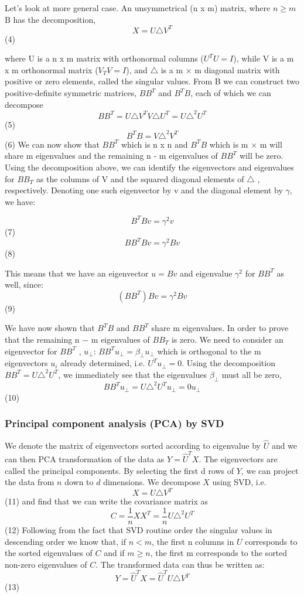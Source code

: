 \documentclass[12pt,twoside]{article}
\begin{document}
\bigbreak
Let's look at more general case. An unsymmetrical (n x m) matrix, where $n \geq m$ B has the decomposition,
$$X = U\triangle V^{T}$$  \hfill(4)

where U is a n x m matrix with orthonormal columns ($U^{T}U = I$), while V is a m x m orthonormal matrix ($V_{T}V = I$), and $\triangle$ is a m × m diagonal matrix with positive or zero elements, called the singular values.
\bigbreak
From B we can construct two positive-definite symmetric matrices, $BB^{T}$ and $B^{T}B$, each of which we can decompose
$$BB^{T} = U\triangle V^{T}V\triangle U^{T} = U\triangle^2U^{T} $$  \hfill(5)
$$B^{T}B = V\triangle^2V^{T} $$ \hfill (6)
\bigbreak
We can now show that $BB^{T}$ which is n x n and $B^{T}B$ which is m × m will share m eigenvalues and the remaining n - m eigenvalues of $BB^{T} $ will be zero.
\bigbreak
Using the decomposition above, we can identify the eigenvectors and eigenvalues for $BB_{T}$ as the columns of V and the squared diagonal elements of $\triangle$ , respectively. Denoting one such eigenvector by v and the diagonal element by $\gamma$, we have:

$$B^{T}Bv = \gamma^2v$$ \hfill (7)
$$BB^{T}Bv = \gamma^2Bv$$  \hfill (8)

\bigbreak
This means that we have an eigenvector $u = Bv$ and eigenvalue $\gamma^2$ for $BB^{T}$ as well, since:
\bigbreak
$$(BB^{T})Bv = \gamma^2Bv$$ \hfill (9)

\bigbreak
We have now shown that $B^{T}B$ and $BB^{T}$ share m eigenvalues.
\bigbreak
In order to prove that the remaining n − m eigenvalues of $BB_{T}$ is zero. We need to consider an eigenvector for  $BB^{T}$ , $u_{\perp}$: $BB^{T} u_{\perp} = \beta_{\perp} u_{\perp}$ which is orthogonal to the m eigenvectors $u_{i}$ already determined, i.e. $U^{T} u_{\perp} = 0$. Using the decomposition $BB^{T} = U\triangle^2U^{T}$, we immediately see that the eigenvalues $\beta_{\perp}$ must all be zero,
$$BB^{T} u_{\perp} = U\triangle^2U^{T} u_{\perp} = 0 u_{\perp}$$ \hfill (10)
\bigbreak
\subsubsection*{Principal component analysis (PCA) by SVD}
\bigbreak
We denote the matrix of eigenvectors sorted according to eigenvalue by $\hat{U}$ and we can then PCA transformation of the data as $Y = \hat{U}^{T}X$. The eigenvectors are called the principal components. By selecting the first d rows of $Y$, we can project the data from $n$ down to $d$ dimensions.
\bigbreak
We decompose $X$ using SVD, i.e.
$$X = U\triangle V^{T}$$ \hfill (11)\newline
and find that we can write the covariance matrix as
$$C = \frac{1}{n} XX^{T} = \frac{1}{n} U\triangle^2U^{T}$$ \hfill (12)
\bigbreak
Following from the fact that SVD routine order the singular values in descending order we know that, if $n < m$, the first n columns in $U$ corresponds to the sorted eigenvalues of $C$ and if $m \geq n$, the first m corresponds to the sorted non-zero eigenvalues of $C$. The transformed data can thus be written as:
$$Y = \hat{U}^{T}X = \hat{U}^{T}U\triangle V^T$$ \hfill (13)
\end{document}
